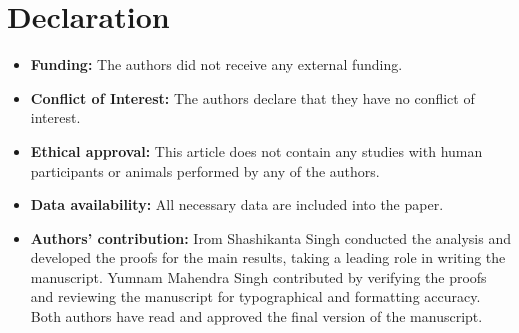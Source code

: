 \documentclass[pdflatex,sn-mathphys-num]{sn-jnl}%
\theoremstyle{thmstyleone}%
\theoremstyle{thmstyletwo}%
\theoremstyle{thmstylethree}%
\begin{document}
\section*{Declaration}
\begin{itemize}
    \item \textbf{Funding:} The authors did not receive any external funding.
    \item \textbf{Conflict of Interest:} The authors declare that they have no conflict of interest.
    \item\textbf{Ethical approval:} This article does not contain any studies with human participants or animals performed by any of the authors.
    \item \textbf{Data availability: } All necessary data are included into the paper.
    \item \textbf{Authors' contribution: } Irom Shashikanta Singh conducted the analysis and developed the proofs for the main results, taking a leading role in writing the manuscript. Yumnam Mahendra Singh contributed by verifying the proofs and reviewing the manuscript for typographical and formatting accuracy. Both authors have read and approved the final version of the manuscript.
\end{itemize}










\end{document}
